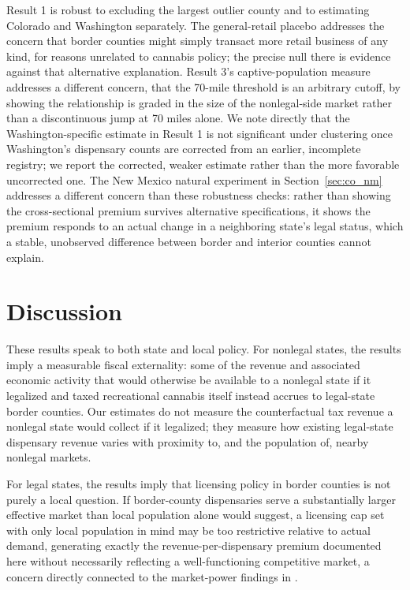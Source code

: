 \documentclass[12pt]{article}
\begin{document}
Result 1 is robust to excluding the largest outlier county and to estimating Colorado and Washington
separately. The general-retail placebo addresses the concern that border counties might simply transact more
retail business of any kind, for reasons unrelated to cannabis policy; the precise null there is evidence
against that alternative explanation. Result 3's captive-population measure addresses a different concern,
that the 70-mile threshold is an arbitrary cutoff, by showing the relationship is graded in the size of the
nonlegal-side market rather than a discontinuous jump at 70 miles alone. We note directly that the
Washington-specific estimate in Result 1 is not significant under clustering once Washington's dispensary
counts are corrected from an earlier, incomplete registry; we report the corrected, weaker estimate rather
than the more favorable uncorrected one. The New Mexico natural experiment in Section~\ref{sec:co_nm}
addresses a different concern than these robustness checks: rather than showing the cross-sectional premium
survives alternative specifications, it shows the premium responds to an actual change in a neighboring
state's legal status, which a stable, unobserved difference between border and interior counties cannot
explain.

\section{Discussion}

These results speak to both state and local policy. For nonlegal states, the results imply a measurable
fiscal externality: some of the revenue and associated economic activity that would otherwise be available
to a nonlegal state if it legalized and taxed recreational cannabis itself instead accrues to legal-state
border counties. Our estimates do not measure the counterfactual tax revenue a nonlegal state would collect
if it legalized; they measure how existing legal-state dispensary revenue varies with proximity to, and the
population of, nearby nonlegal markets.

For legal states, the results imply that licensing policy in border counties is not purely a local question.
If border-county dispensaries serve a substantially larger effective market than local population alone
would suggest, a licensing cap set with only local population in mind may be too restrictive relative to
actual demand, generating exactly the revenue-per-dispensary premium documented here without necessarily
reflecting a well-functioning competitive market, a concern directly connected to the market-power findings
in \citet{HollenbeckUetake2021}.
\end{document}
